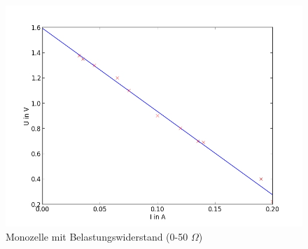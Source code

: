 	\begin{figure}[h]
		\begin{center}
		\includegraphics[scale=0.5]{picb.jpg}
		\caption{Monozelle mit Belastungswiderstand (0-50 $\Omega$)}
		\label{picb}
		\end{center}	
	\end{figure}